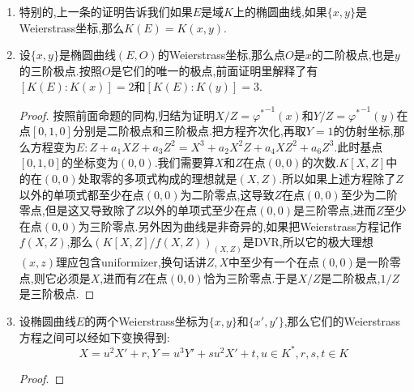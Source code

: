 \begin{enumerate}
\begin{proof}
		\qquad
		
		先证明$\varphi:E\to C\subseteq\mathbb{P}^2_{\overline{K}}$的次数为1,也即$K(E)=K(x,y)$.考虑映射$[x,1]:E\to\mathbb{P}^1_{\overline{K}}$,$P\mapsto[x(P),1]$.一般的如果$\varphi:C_1\to C_2$是两条光滑射影曲线之间的非常值映射,那么对任意$Q\in C_2$,总有$\deg\varphi=\sum_{P\in\varphi^{-1}(Q)}\mathrm{ord}_P(\varphi^*t_{\varphi(P)})$,其中$t_{\varphi(P)}\in K(C_2)$是$\varphi(P)$处的uniformizer.把这个结论用在$[x,1]$和$Q=[x(O),1]=[1,0]$上,按照$x$只有极点$O$并且次数2,得到$\deg[x,1]=2$,也即$[K(E):K(x)]=2$.同理$[K(E):K(y)]=3$.那么$[K(E):K(x,y)]$同时整除2和3,于是它是1.
		
		\qquad
		
		最后证明$C$是光滑的(因为$K$是完全域,光滑等价于非奇异).假设$C$是奇异曲线,那么我们解释过存在次数1的有理映射$\psi:E\to\mathbb{P}^1_{\overline{K}}$.那么复合有理映射$\psi\circ\varphi:E\to\mathbb{P}^1_{\overline{K}}$是光滑曲线之间的次数为1的有理映射,所以这是一个同构.但是$E$的亏格是1,而$\mathbb{P}^1$的亏格是0,这矛盾.
	\end{proof}
	\item 特别的,上一条的证明告诉我们如果$E$是域$K$上的椭圆曲线,如果$\{x,y\}$是Weierstrass坐标,那么$K(E)=K(x,y)$.
	\item 设$\{x,y\}$是椭圆曲线$(E,O)$的Weierstrass坐标,那么点$O$是$x$的二阶极点,也是$y$的三阶极点.按照$O$是它们的唯一的极点,前面证明里解释了有$[K(E):K(x)]=2$和$[K(E):K(y)]=3$.
	\begin{proof}
		
		按照前面命题的同构,归结为证明$X/Z={\varphi^*}^{-1}(x)$和$Y/Z={\varphi^*}^{-1}(y)$在点$[0,1,0]$分别是二阶极点和三阶极点.把方程齐次化,再取$Y=1$的仿射坐标,那么方程变为$E:Z+a_1XZ+a_3Z^2=X^3+a_2X^2Z+a_4XZ^2+a_6Z^3$.此时基点$[0,1,0]$的坐标变为$(0,0)$.我们需要算$X$和$Z$在点$(0,0)$的次数.$K[X,Z]$中的在$(0,0)$处取零的多项式构成的理想就是$(X,Z)$.所以如果上述方程除了$Z$以外的单项式都至少在点$(0,0)$为二阶零点,这导致$Z$在点$(0,0)$至少为二阶零点,但是这又导致除了$Z$以外的单项式至少在点$(0,0)$是三阶零点,进而$Z$至少在点$(0,0)$为三阶零点.另外因为曲线是非奇异的,如果把Weierstrass方程记作$f(X,Z)$,那么$(K[X,Z]/f(X,Z))_{(X,Z)}$是DVR,所以它的极大理想$(x,z)$理应包含uniformizer,换句话讲$Z,X$中至少有一个在点$(0,0)$是一阶零点,则它必须是$X$,进而有$Z$在点$(0,0)$恰为三阶零点.于是$X/Z$是二阶极点,$1/Z$是三阶极点.
	\end{proof}
	\item 设椭圆曲线$E$的两个Weierstrass坐标为$\{x,y\}$和$\{x',y'\}$,那么它们的Weierstrass方程之间可以经如下变换得到:
	$$X=u^2X'+r,Y=u^3Y'+su^2X'+t,u\in K^*,r,s,t\in K$$
	\begin{proof}
		

\end{proof}
\end{enumerate}
